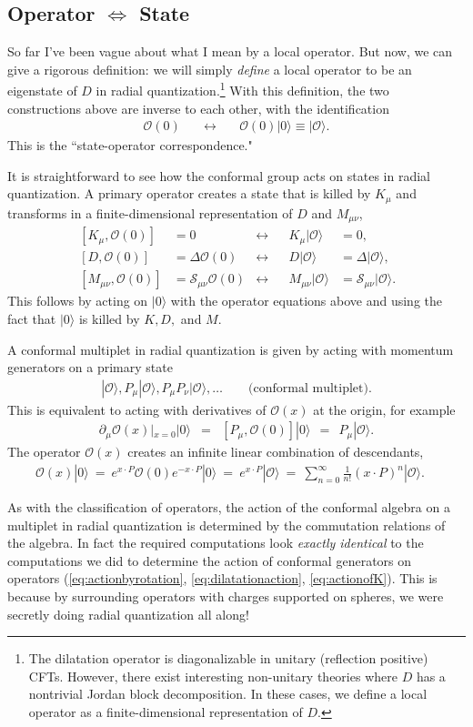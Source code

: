 \documentclass{ws-rv9x6}
\newcommand\be{\begin{eqnarray}}
\newcommand\ee{\end{eqnarray}}
\newcommand\cO{\mathcal{O}}
\newcommand\ptl\partial
\newcommand\<\langle
\renewcommand\>\rangle
\renewcommand\.{\cdot}
\newcommand\De{\Delta}
\newcommand\cS{\mathcal{S}}
\newcommand\oo\infty
\begin{document}
\subsection{Operator $\Longleftrightarrow$ State}

So far I've been vague about what I mean by a local operator.  But now, we can give a rigorous definition: we will simply {\it define\/} a local operator to be an eigenstate of $D$ in radial quantization.\footnote{The dilatation operator is diagonalizable in unitary (reflection positive) CFTs.  However, there exist interesting non-unitary theories where $D$ has a nontrivial Jordan block decomposition.  In these cases, we define a local operator as a finite-dimensional representation of $D$.} With this definition, the two constructions above are inverse to each other, with the identification
\be
\cO(0)\quad &\longleftrightarrow& \quad \cO(0)|0\>\equiv |\cO\>.
\ee
This is the ``state-operator correspondence."

It is straightforward to see how the conformal group acts on states in radial quantization.  A primary operator creates a state that is killed by $K_\mu$ and transforms in a finite-dimensional representation of $D$ and $M_{\mu\nu}$,
\begin{align}
\label{eq:operatortostateconditionK}
\,[K_\mu,\cO(0)]&=0 &\longleftrightarrow && K_\mu|\cO\>&=0,\\
\label{eq:operatortostateconditionD}
\,[D,\cO(0)] &= \De\cO(0) &\longleftrightarrow&& D|\cO\>&=\De|\cO\>,\\
\label{eq:operatortostateconditionM}
\,[M_{\mu\nu},\cO(0)]&=\cS_{\mu\nu}\cO(0) &\longleftrightarrow&& M_{\mu\nu}|\cO\> &= \cS_{\mu\nu}|\cO\>.
\end{align}
This follows by acting on $|0\>$ with the operator equations above and using the fact that $|0\>$ is killed by $K,D,$ and $M$.

A conformal multiplet in radial quantization is given by acting with momentum generators on a primary state
\be
|\cO\>, P_\mu|\cO\>, P_\mu P_\nu|\cO\>, \dots \qquad\textrm{(conformal multiplet)}.
\ee
This is equivalent to acting with derivatives of $\cO(x)$ at the origin, for example
\be
\ptl_\mu\cO(x)|_{x=0}|0\> &=& [P_\mu,\cO(0)]|0\>\ \ =\ \ P_\mu|\cO\>.
\ee
The operator $\cO(x)$ creates an infinite linear combination of descendants,
\be
\cO(x)|0\>\ =\  e^{x\.P}\cO(0)e^{-x\.P}|0\>\ =\ e^{x\.P}|\cO\>\ =\ \sum_{n=0}^\oo \frac{1}{n!}(x\.P)^n|\cO\>.\quad
\ee

As with the classification of operators, the action of the conformal algebra on a multiplet in radial quantization is determined by the commutation relations of the algebra. In fact the required computations look {\it exactly identical\/} to the computations we did to determine the action of conformal generators on operators (\ref{eq:actionbyrotation}, \ref{eq:dilatationaction}, \ref{eq:actionofK}).  This is because by surrounding operators with charges supported on spheres, we were secretly doing radial quantization all along!
\end{document}
